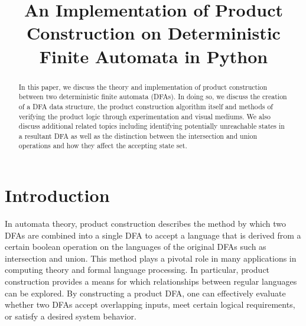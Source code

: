 \documentclass[conference]{IEEEtran}
\begin{document}
\title{An Implementation of Product Construction on Deterministic Finite Automata in Python}

\author{
\and
{}
\and
{}
}

\maketitle

\begin{abstract}
    In this paper, we discuss the theory and implementation of product construction between two deterministic finite automata (DFAs). In doing so, we discuss the creation of a DFA data structure, the product construction algorithm itself and methods of verifying the product logic through experimentation and visual mediums. We also discuss additional related topics including identifying potentially unreachable states in a resultant DFA as well as the distinction between the intersection and union operations and how they affect the accepting state set.
\end{abstract}

\section{Introduction}
In automata theory, product construction describes the method by which two DFAs are combined into a single DFA to accept a language that is derived from a certain boolean operation on the languages of the original DFAs such as intersection and union. This method plays a pivotal role in many applications in computing theory and formal language processing. In particular, product construction provides a means for which relationships between regular languages can be explored. By constructing a product DFA, one can effectively evaluate whether two DFAs accept overlapping inputs, meet certain logical requirements, or satisfy a desired system behavior.
\end{document}
